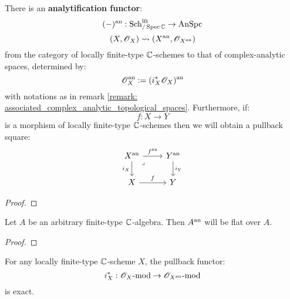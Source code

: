         \begin{proposition} \label{prop: complex_analytic_completions_of_locally_finite_type_C_schemes}
            There is an \textbf{analytification functor}:
                $$(-)^{\mathrm{an}}: \mathrm{Sch}_{/\operatorname{Spec} \mathbb{C}}^{\mathrm{lft}} \to \mathrm{An}\mathrm{Spc}$$
                $$(X, \mathscr{O}_X) \leadsto (X^{\mathrm{an}}, \mathscr{O}_{X^{\mathrm{an}}})$$
            from the category of locally finite-type $\mathbb{C}$-schemes to that of complex-analytic spaces, determined by:
                $$\mathscr{O}_X^{\mathrm{an}} := (i_X^*\mathscr{O}_X)^{\mathrm{an}}$$
            with notations as in remark \ref{remark: associated_complex_analytic_topological_spaces}. Furthermore, if:
                $$f: X \to Y$$
            is a morphism of locally finite-type $\mathbb{C}$-schemes then we will obtain a pullback square:
                $$
                    \begin{tikzcd}
                    {X^{\an}} & {Y^{\an}} \\
                    X & Y
                    \arrow["{f^{\an}}", from=1-1, to=1-2]
                    \arrow["f", from=2-1, to=2-2]
                    \arrow["{i_X}"', from=1-1, to=2-1]
                    \arrow["{i_Y}", from=1-2, to=2-2]
                    \arrow["\lrcorner"{anchor=center, pos=0.125}, draw=none, from=1-1, to=2-2]
                    \end{tikzcd}
                $$
        \end{proposition}
            \begin{proof}
                
            \end{proof}
        \begin{lemma} \label{lemma: flatness_of_complex_analytifications}
            Let $A$ be an arbitrary finite-type $\mathbb{C}$-algebra. Then $A^{\mathrm{an}}$ will be flat over $A$. 
        \end{lemma}
            \begin{proof}
                
            \end{proof}
        \begin{corollary} \label{coro: flatness_of_complex_analytifications}
            For any locally finite-type $\mathbb{C}$-scheme $X$, the pullback functor:
                $$i_X^*: \mathscr{O}_X\text{-}\mathrm{mod} \to \mathscr{O}_{X^{\mathrm{an}}}\text{-}\mathrm{mod}$$
            is exact. 
        \end{corollary}
        
